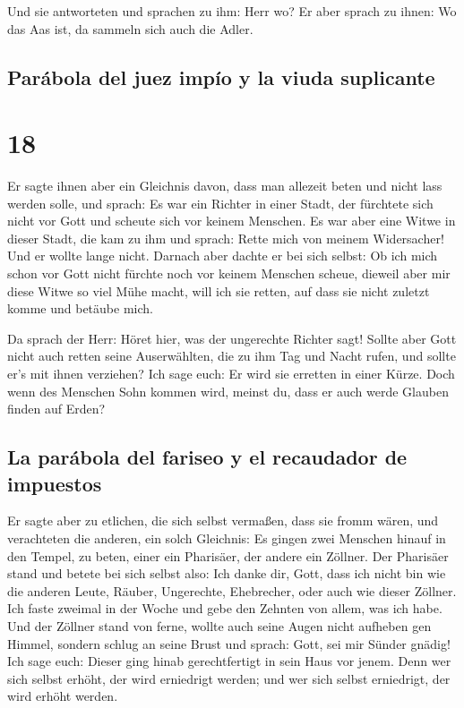  Und sie antworteten und sprachen zu ihm: Herr wo? Er
aber sprach zu ihnen: Wo das Aas ist, da sammeln sich auch die Adler.

\hypertarget{paruxe1bola-del-juez-impuxedo-y-la-viuda-suplicante}{%
\subsection{Parábola del juez impío y la viuda
suplicante}\label{paruxe1bola-del-juez-impuxedo-y-la-viuda-suplicante}}

\hypertarget{section-17}{%
\section{18}\label{section-17}}

 Er sagte ihnen aber ein Gleichnis davon, dass man
allezeit beten und nicht lass werden solle,  und sprach:
Es war ein Richter in einer Stadt, der fürchtete sich nicht vor Gott und
scheute sich vor keinem Menschen.  Es war aber eine Witwe
in dieser Stadt, die kam zu ihm und sprach: Rette mich von meinem
Widersacher!  Und er wollte lange nicht. Darnach aber
dachte er bei sich selbst: Ob ich mich schon vor Gott nicht fürchte noch
vor keinem Menschen scheue,  dieweil aber mir diese Witwe
so viel Mühe macht, will ich sie retten, auf dass sie nicht zuletzt
komme und betäube mich.

 Da sprach der Herr: Höret hier, was der ungerechte
Richter sagt!  Sollte aber Gott nicht auch retten seine
Auserwählten, die zu ihm Tag und Nacht rufen, und sollte er's mit ihnen
verziehen?  Ich sage euch: Er wird sie erretten in einer
Kürze. Doch wenn des Menschen Sohn kommen wird, meinst du, dass er auch
werde Glauben finden auf Erden?

\hypertarget{la-paruxe1bola-del-fariseo-y-el-recaudador-de-impuestos}{%
\subsection{La parábola del fariseo y el recaudador de
impuestos}\label{la-paruxe1bola-del-fariseo-y-el-recaudador-de-impuestos}}

 Er sagte aber zu etlichen, die sich selbst vermaßen, dass
sie fromm wären, und verachteten die anderen, ein solch Gleichnis:
 Es gingen zwei Menschen hinauf in den Tempel, zu beten,
einer ein Pharisäer, der andere ein Zöllner.  Der
Pharisäer stand und betete bei sich selbst also: Ich danke dir, Gott,
dass ich nicht bin wie die anderen Leute, Räuber, Ungerechte,
Ehebrecher, oder auch wie dieser Zöllner.  Ich faste
zweimal in der Woche und gebe den Zehnten von allem, was ich habe.
 Und der Zöllner stand von ferne, wollte auch seine Augen
nicht aufheben gen Himmel, sondern schlug an seine Brust und sprach:
Gott, sei mir Sünder gnädig!  Ich sage euch: Dieser ging
hinab gerechtfertigt in sein Haus vor jenem. Denn wer sich selbst
erhöht, der wird erniedrigt werden; und wer sich selbst erniedrigt, der
wird erhöht werden.


